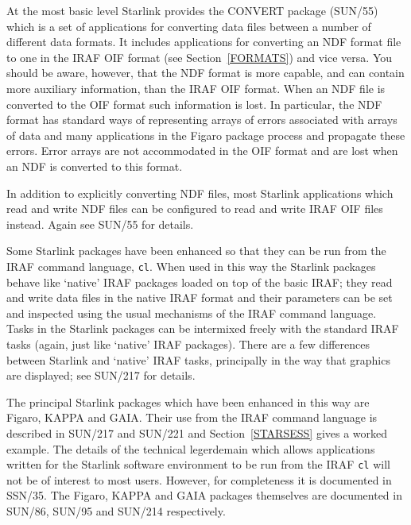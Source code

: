 \documentclass[twoside,11pt]{article}
\newcommand{\xref}[3]{#1}
\begin{document}
At the most basic level Starlink provides the CONVERT package 
(\xref{SUN/55}{sun55}{}\cite{SUN55}) which is a set of applications
for converting data files between a number of different data formats.
It includes applications for converting an NDF format file to one in
the IRAF OIF format (see Section~\ref{FORMATS}) and vice versa.  You
should be aware, however, that the NDF format is more capable, and can
contain more auxiliary information, than the IRAF OIF format.  When
an NDF file is converted to the OIF format such information is lost.
In particular, the NDF format has standard ways of representing arrays
of errors associated with arrays of data and many applications in the
Figaro package process and propagate these errors.  Error arrays are
not accommodated in the OIF format and are lost when an NDF is converted
to this format.

In addition to explicitly converting NDF files, most Starlink
applications which read and write NDF files can be configured to
read and write IRAF OIF files instead.  Again see
\xref{SUN/55}{sun55}{}\cite{SUN55} for details.

Some Starlink packages have been enhanced so that they can be run from
the IRAF command language, {\tt cl}.  When used in this way the Starlink
packages behave like `native' IRAF packages loaded on top of the basic
IRAF; they read and write data files in the native IRAF format and their
parameters can be set and inspected using the usual mechanisms of the
IRAF command language.  Tasks in the Starlink packages can be intermixed
freely with the standard IRAF tasks (again, just like `native' IRAF
packages).  There are a few differences between Starlink and `native'
IRAF tasks, principally in the way that graphics are displayed; see
\xref{SUN/217}{sun217}{}\cite{SUN217} for details.

The principal Starlink packages which have been enhanced in this way
are Figaro, KAPPA and GAIA.  Their use from the IRAF command language is
described in \xref{SUN/217}{sun217}{}\cite{SUN217} and
\xref{SUN/221}{sun221}{}\cite{SUN221} and Section~\ref{STARSESS} gives
a worked example.  The details of the technical legerdemain which
allows applications written for the Starlink software environment to
be run from the IRAF {\tt cl} will not be of interest to most users.
However, for completeness it is documented in
\xref{SSN/35}{ssn35}{}\cite{SSN35}.  The Figaro, KAPPA and GAIA packages
themselves are documented in \xref{SUN/86}{sun86}{}\cite{SUN86},
\xref{SUN/95}{sun95}{}\cite{SUN95} and \xref{SUN/214}{sun214}{}\cite{SUN214}
respectively.
\end{document}

